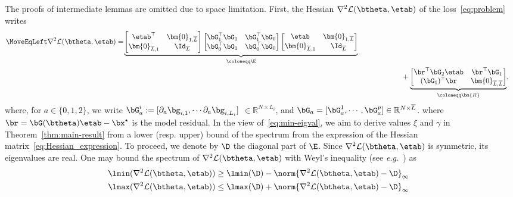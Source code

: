 \documentclass[conference,english,final,svgnames]{IEEEtran}
\begin{document}
The proofs of intermediate lemmas are omitted due to space limitation. First, the Hessian $\nabla^2 \mathcal{L}(\btheta, \etab)$ of the loss~\eqref{eq:problem} writes
\begin{align}\label{eq:Hessian_expression}
    \MoveEqLeft \nabla^2 \mathcal{L}(\btheta, \etab) = \hspace{-2pt}\underbrace{\begin{bmatrix}
    \etab^{\top} & \bm{0}_{1, \overline{L}}  \\
    \bm{0}_{\overline{L}, 1} & \Id_{\overline{L}}
    \end{bmatrix}
    \begin{bmatrix}
    \bG_1^{\top}\bG_1 & \bG_1^{\top}\bG_0 \\
        \bG_0^{\top}\bG_1 & \bG_0^{\top}\bG_0
    \end{bmatrix}
    \begin{bmatrix}
    \etab & \bm{0}_{1, \overline{L}}  \\
    \bm{0}_{\overline{L}, 1} & \Id_{\overline{L}}
    \end{bmatrix}}_{\coloneqq \E} \nonumber \\
    & \qquad \qquad \qquad + \underbrace{\begin{bmatrix}
        \br^{\top} \bG_2\etab & \br^{\top}\bG_1 \\
        (\bG_1)^{\top}\br & \bm{0}_{\overline{L}, \overline{L}}
    \end{bmatrix}}_{\coloneqq \bm{R}},
\end{align}
where, for $a \in \{0,1,2\}$, we write $\bG^i_a := [\partial_a\bg_{i,1}, \cdots
\partial_a \bg_{i,L_i}]$ $\in \mathbb{R}^{N \times L_i}$, and $\bG_a = [\bG^1_a,\cdots, \bG^p_a] \in \mathbb{R}^{N \times \overline{L}}$. 
where $\br = \bG(\btheta) \etab - \bx^{\star}$ is the model residual. In the view of~\eqref{eq:min-eigval}, we aim to derive values $\xi$ and $\gamma$ in Theorem~\ref{thm:main-result} from a lower (resp. upper) bound of the spectrum from the expression of the Hessian matrix~\eqref{eq:Hessian_expression}.
To proceed, we denote by $\D$ the diagonal part of $\E$. Since $\nabla^2 \mathcal{L}(\btheta, \etab)$ is symmetric, its eigenvalues are real. One may bound the spectrum of $\nabla^2 \mathcal{L}(\btheta, \etab)$ with Weyl's inequality
 (see \emph{e.g.}~\cite[Theorem 8.1.5]{golub2013MatrixComputations}) as
\begin{subequations}\label{eq:weyl}
\begin{align}
    \hspace{-6pt} \lmin(\nabla^2 \mathcal{L}(\btheta, \etab)) &\geq \lmin(\D) - \norm{\nabla^2 \mathcal{L}(\btheta, \etab) - \D}_{\infty} \label{eq:lower_Weyl} \\
    \hspace{-6pt} \lmax(\nabla^2 \mathcal{L}(\btheta, \etab)) &\leq \lmax(\D) + \norm{\nabla^2 \mathcal{L}(\btheta, \etab) - \D}_{\infty} \label{eq:upper_Weyl}
\end{align}
\end{subequations}
\end{document}
